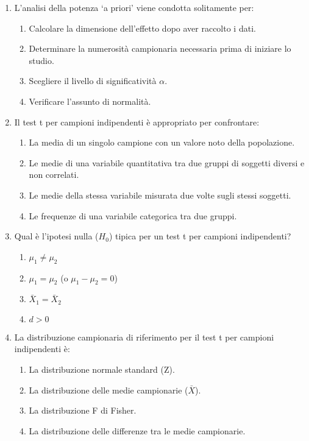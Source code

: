 \documentclass[12pt, a4paper]{article}
\newcommand{\alphaerr}{\alpha} %
\newcommand{\Hnull}{H_0} %
\newcommand{\cohend}{d} %
\begin{document}
\begin{enumerate}
    \item L'analisi della potenza   `a priori' viene condotta solitamente per:
    \begin{enumerate}
        \item Calcolare la dimensione dell'effetto dopo aver raccolto i dati.
        \item Determinare la numerosità campionaria necessaria prima di iniziare lo studio.
        \item Scegliere il livello di significatività $\alphaerr$.
        \item Verificare l'assunto di normalità.
    \end{enumerate}

    \item Il test t per campioni indipendenti è appropriato per confrontare:
    \begin{enumerate}
        \item La media di un singolo campione con un valore noto della popolazione.
        \item Le medie di una variabile quantitativa tra due gruppi di soggetti diversi e non correlati.
        \item Le medie della stessa variabile misurata due volte sugli stessi soggetti.
        \item Le frequenze di una variabile categorica tra due gruppi.
    \end{enumerate}

    \item Qual è l'ipotesi nulla ($\Hnull$) tipica per un test t per campioni indipendenti?
    \begin{enumerate}
        \item $\mu_1 \neq \mu_2$
        \item $\mu_1 = \mu_2$ (o $\mu_1 - \mu_2 = 0$)
        \item $\bar{X}_1 = \bar{X}_2$
        \item $\cohend > 0$
    \end{enumerate}

    \item La distribuzione campionaria di riferimento per il test t per campioni indipendenti è:
    \begin{enumerate}
        \item La distribuzione normale standard (Z).
        \item La distribuzione delle medie campionarie ($\bar{X}$).
        \item La distribuzione F di Fisher.
        \item La distribuzione delle differenze tra le medie campionarie.
    \end{enumerate}


\end{enumerate}
\end{document}

